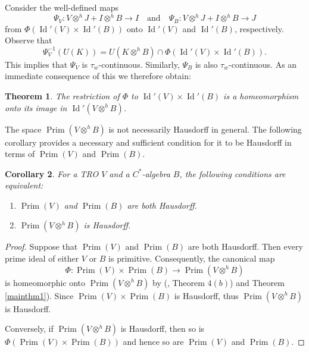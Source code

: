\documentclass{birkjour}
\newtheorem{thm}{Theorem}[section]
\newtheorem{cor}[thm]{Corollary}
\theoremstyle{definition}
\theoremstyle{remark}
\numberwithin{equation}{section}
\begin{document}
Consider   the well-defined maps  \[
\Psi_V :  V\otimes^h J + I \otimes^h B \to I \quad \text{and} \quad \Psi_B : V \otimes^h J + I \otimes^h B \to J
\]
 from $\Phi(\operatorname{Id}'(V) \times \operatorname{Id}'(B))$ onto $\operatorname{Id}'(V)$ and $\operatorname{Id}'(B)$, respectively. Observe that  
\[
\Psi_V^{-1}(U(K)) = U(K \otimes^h B) \cap \Phi(\operatorname{Id}'(V) \times \operatorname{Id}'(B)).
\]
This implies that \( \Psi_V \) is \( \tau_w \)-continuous. Similarly, \( \Psi_B \) is also \( \tau_w \)-continuous. As an immediate consequence of this we therefore obtain: 
 
 
 
 
 
 
 


\begin{thm}\label{mainresult2}
The restriction of $\Phi$ to $\operatorname{Id}'(V) \times \operatorname{Id}'(B)$ is a homeomorphism onto its image in $\operatorname{Id}'(V \otimes^h B)$.
\end{thm}


The space $\operatorname{Prim}(V \otimes^h B)$ is not necessarily Hausdorff in general. The following corollary provides a necessary and sufficient condition for it to be Hausdorff in terms of $\operatorname{Prim}(V)$ and $\operatorname{Prim}(B)$.




\begin{cor}
    \textit{For a  TRO $V$ and a $C^*$-algebra $B$, the following conditions are equivalent:}
\begin{enumerate}
    \item[(i)] $\operatorname{Prim}(V)$ and $\operatorname{Prim}(B)$ are both Hausdorff.
    \item[(ii)] $\operatorname{Prim}(V \otimes^h B)$ is Hausdorff.
    \end{enumerate}
\end{cor}

\begin{proof}
    Suppose that $\operatorname{Prim}(V)$ and $\operatorname{Prim}(B)$ are both Hausdorff. Then every prime ideal of either $V$ or $B$ is primitive. Consequently, the canonical map  
\[
\Phi: \operatorname{Prim}(V) \times \operatorname{Prim}(B) \to \operatorname{Prim}(V \otimes^h B)
\]
is homeomorphic onto  $\operatorname{Prim}(V \otimes^h B)$ by (\cite{AA}, Theorem $4(b)$) and Theorem \ref{mainthm1}). Since $\operatorname{Prim}(V) \times \operatorname{Prim}(B)$ is Hausdorff, thus $\operatorname{Prim}(V \otimes^h B)$ is Hausdorff.

Conversely, if $\operatorname{Prim}(V \otimes^h B)$ is Hausdorff, then so is $\Phi(\operatorname{Prim}(V) \times \operatorname{Prim}(B))$ and hence so are $\operatorname{Prim}(V)$ and $\operatorname{Prim}(B)$.
    

\end{proof}
\end{document}
